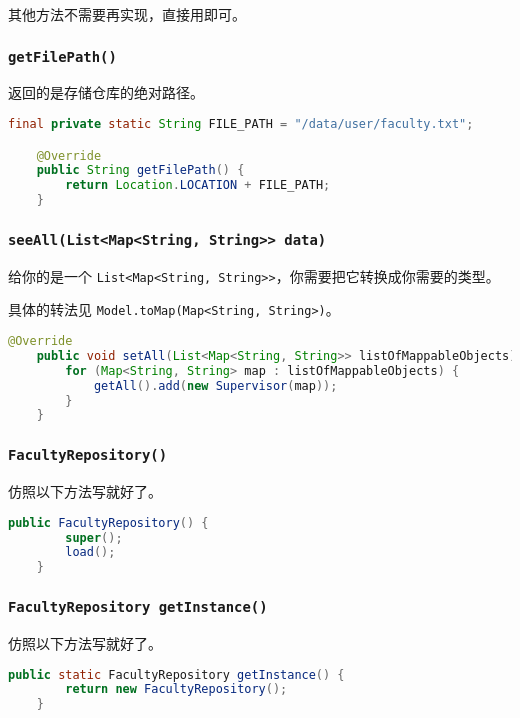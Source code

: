 \documentclass[hyperref,UTF8,12pt,a4paper]{ctexart}
\begin{document}
其他方法不需要再实现，直接用即可。

\subsubsection{\texttt{getFilePath()}}

返回的是存储仓库的绝对路径。

\begin{lstlisting}[language=Java]
    final private static String FILE_PATH = "/data/user/faculty.txt";

    @Override
    public String getFilePath() {
        return Location.LOCATION + FILE_PATH;
    }
\end{lstlisting}

\subsubsection{\texttt{seeAll(List<Map<String, String>> data)}}

给你的是一个 \texttt{List<Map<String, String>>}，你需要把它转换成你需要的类型。

具体的转法见 \texttt{Model.toMap(Map<String, String>)}。

\begin{lstlisting}[language=Java]
    @Override
    public void setAll(List<Map<String, String>> listOfMappableObjects) {
        for (Map<String, String> map : listOfMappableObjects) {
            getAll().add(new Supervisor(map));
        }
    }
\end{lstlisting}

\subsubsection{\texttt{FacultyRepository()}}

仿照以下方法写就好了。

\begin{lstlisting}[language=Java]
	public FacultyRepository() {
		super();
		load();
	}
\end{lstlisting}

\subsubsection{\texttt{FacultyRepository getInstance()}}

仿照以下方法写就好了。

\begin{lstlisting}[language=Java]
	public static FacultyRepository getInstance() {
		return new FacultyRepository();
	}
\end{lstlisting}
\end{document}

